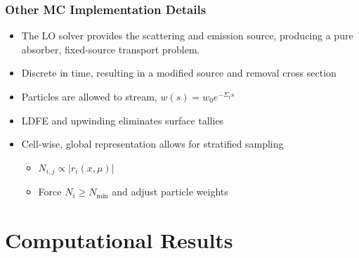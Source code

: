 \documentclass[xcolor=dvipsnames,hyperref={pdfpagelabels=false},handout,unknownkeysallowed]{beamer}
\newcommand{\colb}[1]{{\color{blue} #1}}
\newlength{\wideitemsep}
\let\olditem\item
\renewcommand{\item}{\setlength{\itemsep}{\wideitemsep}\olditem}
\begin{document}
\begin{frame}
    \frametitle{Other MC Implementation Details}
    \begin{itemize}
        \item The LO solver provides the scattering and emission source, producing a
            pure absorber, fixed-source transport problem.
        \item Discrete in time, resulting in a modified source and removal cross
            section
        \item Particles are allowed to stream, $w(s)=w_0 e^{-\Sigma_t s}$
        \item LDFE and upwinding \colb{eliminates} surface tallies
    \item Cell-wise, global representation allows for \colb{stratified} sampling
        \begin{itemize}
            \item $N_{i,j} \propto{|r_i(x,\mu)|}$
            \item Force $N_i \geq N_{\min}$ and adjust particle weights
        \end{itemize}
    \end{itemize}
\end{frame}


\section{Computational Results}
\subsection{}
\end{document}
